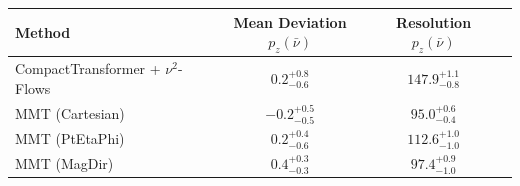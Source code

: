     \begin{tabular}{lccc}
        \toprule
        Method & Mean Deviation $p_{z}(\bar{\nu})$ & Resolution $p_{z}(\bar{\nu})$ \\
        \midrule
        CompactTransformer + $\nu^2$-Flows & $0.2^{+0.8}_{-0.6}$ & $147.9^{+1.1}_{-0.8}$ \\
        MMT (Cartesian) & $-0.2^{+0.5}_{-0.5}$ & $95.0^{+0.6}_{-0.4}$ \\
        MMT (PtEtaPhi) & $0.2^{+0.4}_{-0.6}$ & $112.6^{+1.0}_{-1.0}$ \\
        MMT (MagDir) & $0.4^{+0.3}_{-0.3}$ & $97.4^{+0.9}_{-1.0}$ \\
        \bottomrule
    \end{tabular}